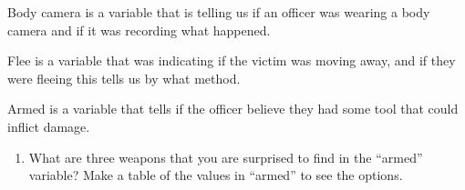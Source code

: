 \documentclass[
]{article}
\newenvironment{Shaded}{\begin{snugshade}}{\end{snugshade}}
\newcommand{\FunctionTok}[1]{\textcolor[rgb]{0.00,0.00,0.00}{#1}}
\newcommand{\NormalTok}[1]{#1}
\newcommand{\SpecialCharTok}[1]{\textcolor[rgb]{0.00,0.00,0.00}{#1}}
\providecommand{\tightlist}{%
  \setlength{\itemsep}{0pt}\setlength{\parskip}{0pt}}
\begin{document}
Body camera is a variable that is telling us if an officer was wearing a
body camera and if it was recording what happened.

Flee is a variable that was indicating if the victim was moving away,
and if they were fleeing this tells us by what method.

Armed is a variable that tells if the officer believe they had some tool
that could inflict damage.

\begin{enumerate}
\def\labelenumi{\alph{enumi}.}
\setcounter{enumi}{3}
\tightlist
\item
  What are three weapons that you are surprised to find in the ``armed''
  variable? Make a table of the values in ``armed'' to see the options.
\end{enumerate}

\begin{Shaded}
\end{Shaded}
\end{document}
